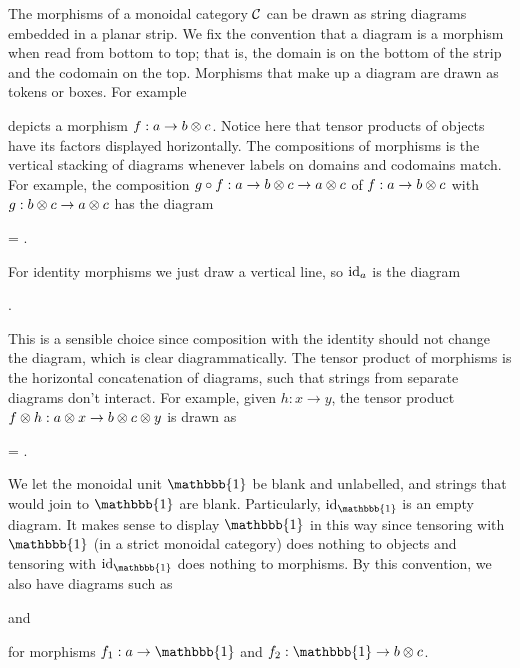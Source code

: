 The morphisms of a monoidal category $\mathcal{C}$ can be drawn as string diagrams embedded in a planar strip. We fix the convention that a diagram is a morphism when read from bottom to top; that is, the domain is on the bottom of the strip and the codomain on the top. Morphisms that make up a diagram are drawn as tokens or boxes. For example
\begin{center}
\end{center}
depicts a morphism $f: a \to b \otimes c$. Notice here that tensor products of objects have its factors displayed horizontally. The compositions of morphisms is the vertical stacking of diagrams whenever labels on domains and codomains match. For example, the composition $g \circ f: a \to b \otimes c \to a \otimes c$ of $f: a \to b \otimes c$ with $g: b \otimes c \to a \otimes c$ has the diagram
\begin{center}
    =
    .
\end{center}
For identity morphisms we just draw a vertical line, so $\operatorname{id}_a$ is the diagram
\begin{center}
    .
\end{center}
This is a sensible choice since composition with the identity should not change the diagram, which is clear diagrammatically. The tensor product of morphisms is the horizontal concatenation of diagrams, such that strings from separate diagrams don't interact. For example, given $h:x \to y$, the tensor product $f \otimes h: a \otimes x \to b \otimes c \otimes y$ is drawn as
\begin{center}
    =
    .
\end{center}
We let the monoidal unit $\mathbbb{1}$ be blank and unlabelled, and strings that would join to $\mathbbb{1}$ are blank. Particularly, $\id_\mathbbb{1}$ is an empty diagram. It makes sense to display $\mathbbb{1}$ in this way since tensoring with $\mathbbb{1}$ (in a strict monoidal category) does nothing to objects and tensoring with $\id_\mathbbb{1}$ does nothing to morphisms. By this convention, we also have diagrams such as
\begin{center}
    \quad and \quad
\end{center}
for morphisms $f_1: a \to \mathbbb{1}$ and $f_2: \mathbbb{1} \to b \tensor c$.

